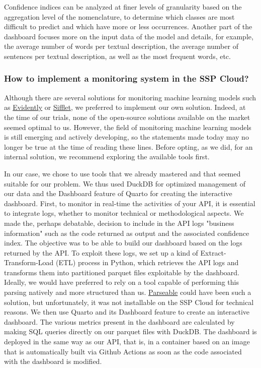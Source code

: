 Confidence indices can be analyzed at finer levels of granularity based on the aggregation level of the nomenclature, to determine which classes are most difficult to predict and which have more or less occurrences. Another part of the dashboard focuses more on the input data of the model and details, for example, the average number of words per textual description, the average number of sentences per textual description, as well as the most frequent words, etc.

\subsubsection{How to implement a monitoring system in the SSP Cloud?}

Although there are several solutions for monitoring machine learning models such as \href{https://www.evidentlyai.com/}{Evidently} or \href{https://www.siffletdata.com/}{Sifflet}, we preferred to implement our own solution. Indeed, at the time of our trials, none of the open-source solutions available on the market seemed optimal to us. However, the field of monitoring machine learning models is still emerging and actively developing, so the statements made today may no longer be true at the time of reading these lines. Before opting, as we did, for an internal solution, we recommend exploring the available tools first.

In our case, we chose to use tools that we already mastered and that seemed suitable for our problem. We thus used DuckDB for optimized management of our data and the Dashboard feature of Quarto for creating the interactive dashboard. First, to monitor in real-time the activities of your API, it is essential to integrate logs, whether to monitor technical or methodological aspects. We made the, perhaps debatable, decision to include in the API logs "business information" such as the code returned as output and the associated confidence index. The objective was to be able to build our dashboard based on the logs returned by the API. To exploit these logs, we set up a kind of Extract-Transform-Load (ETL) process in Python, which retrieves the API logs and transforms them into partitioned parquet files exploitable by the dashboard. Ideally, we would have preferred to rely on a tool capable of performing this parsing natively and more structured than us. \href{https://www.parseable.com/}{Parseable} could have been such a solution, but unfortunately, it was not installable on the SSP Cloud for technical reasons. We then use Quarto and its Dashboard feature to create an interactive dashboard. The various metrics present in the dashboard are calculated by making SQL queries directly on our parquet files with DuckDB. The dashboard is deployed in the same way as our API, that is, in a container based on an image that is automatically built via Github Actions as soon as the code associated with the dashboard is modified.

